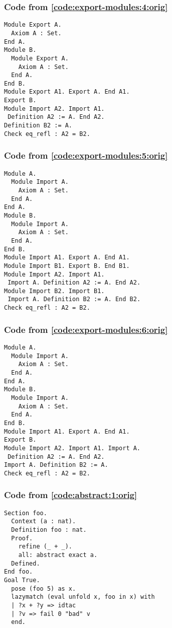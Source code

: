 \documentclass[a4paper,USenglish,cleveref,autoref,thm-restate]{lipics-v2021}
\begin{document}
\subsubsection{Code from \autoref{code:export-modules:4:orig}}\label{code:export-modules:4}
\begin{verbatim}
Module Export A.
  Axiom A : Set.
End A.
Module B.
  Module Export A.
    Axiom A : Set.
  End A.
End B.
Module Export A1. Export A. End A1.
Export B.
Module Import A2. Import A1.
 Definition A2 := A. End A2.
Definition B2 := A.
Check eq_refl : A2 = B2.
\end{verbatim}

\subsubsection{Code from \autoref{code:export-modules:5:orig}}\label{code:export-modules:5}
\begin{verbatim}
Module A.
  Module Import A.
    Axiom A : Set.
  End A.
End A.
Module B.
  Module Import A.
    Axiom A : Set.
  End A.
End B.
Module Import A1. Export A. End A1.
Module Import B1. Export B. End B1.
Module Import A2. Import A1.
 Import A. Definition A2 := A. End A2.
Module Import B2. Import B1.
 Import A. Definition B2 := A. End B2.
Check eq_refl : A2 = B2.
\end{verbatim}
\subsubsection{Code from \autoref{code:export-modules:6:orig}}\label{code:export-modules:6}
\begin{verbatim}
Module A.
  Module Import A.
    Axiom A : Set.
  End A.
End A.
Module B.
  Module Import A.
    Axiom A : Set.
  End A.
End B.
Module Import A1. Export A. End A1.
Export B.
Module Import A2. Import A1. Import A.
 Definition A2 := A. End A2.
Import A. Definition B2 := A.
Check eq_refl : A2 = B2.
\end{verbatim}

\subsubsection{Code from \autoref{code:abstract:1:orig}}\label{code:abstract:1}
\begin{verbatim}
Section foo.
  Context (a : nat).
  Definition foo : nat.
  Proof.
    refine (_ + _).
    all: abstract exact a.
  Defined.
End foo.
Goal True.
  pose (foo 5) as x.
  lazymatch (eval unfold x, foo in x) with
  | ?x + ?y => idtac
  | ?v => fail 0 "bad" v
  end.
\end{verbatim}
\end{document}
